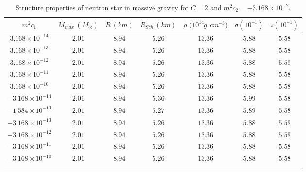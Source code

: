 \documentclass[aps]{revtex4}
\begin{document}
\begin{table*}[tbp]
\caption{Structure properties of neutron star in massive gravity for $C=2$
and $m^{2}c_{2}=-3.168\times 10^{-2}$.}
\label{tab3}
\begin{center}
\begin{tabular}{ccccccc}
\hline\hline
$m^{2}c_{1}$ & ${M_{max}}\ (M_{\odot})$ & $R\ (km)$ & $R_{Sch}\ (km)$ & $%
\overline{\rho }$ $(10^{14}g$ $cm^{-3})$ & $\sigma (10^{-1})$ & $z(10^{-1})$
\\ \hline\hline
$3.168\times 10^{-14}$ & $2.01$ & $8.94$ & $5.26$ & $13.36$ & $5.88$ & $5.58$
\\ \hline
$3.168\times 10^{-13}$ & $2.01$ & $8.94$ & $5.26$ & $13.36$ & $5.88$ & $5.58$
\\ \hline
$3.168\times 10^{-12}$ & $2.01$ & $8.94$ & $5.26$ & $13.36$ & $5.88$ & $5.58$
\\ \hline
$3.168\times 10^{-11}$ & $2.01$ & $8.94$ & $5.26$ & $13.36$ & $5.88$ & $5.58$
\\ \hline
$3.168\times 10^{-10}$ & $2.01$ & $8.94$ & $5.26$ & $13.36$ & $5.88$ & $5.58$
\\ \hline
$-3.168\times 10^{-14}$ & $2.01$ & $8.94$ & $5.36$ & $13.36$ & $5.99$ & $%
5.58 $ \\ \hline
$-1.584\times 10^{-13}$ & $2.01$ & $8.94$ & $5.27$ & $13.36$ & $5.89$ & $%
5.58 $ \\ \hline
$-3.168\times 10^{-13}$ & $2.01$ & $8.94$ & $5.26$ & $13.36$ & $5.88$ & $%
5.58 $ \\ \hline
$-3.168\times 10^{-12}$ & $2.01$ & $8.94$ & $5.26$ & $13.36$ & $5.88$ & $%
5.58 $ \\ \hline
$-3.168\times 10^{-11}$ & $2.01$ & $8.94$ & $5.26$ & $13.36$ & $5.88$ & $%
5.58 $ \\ \hline
$-3.168\times 10^{-10}$ & $2.01$ & $8.94$ & $5.26$ & $13.36$ & $5.88$ & $%
5.58 $ \\ \hline\hline
&  &  &  &  &  &
\end{tabular}%
\end{center}
\end{table*}
\end{document}
